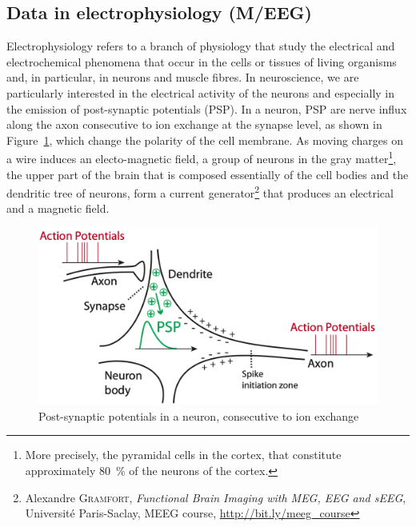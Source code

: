 \subsection{Data in electrophysiology (M/EEG)}\label{data_in_electrophysiology}

Electrophysiology refers to a branch of physiology that study the electrical and electrochemical phenomena that occur in the cells or tissues of living organisms and, in particular, in neurons and muscle fibres.
In neuroscience, we are particularly interested in the electrical activity of the neurons and especially in the emission of post-synaptic potentials (PSP).
In a neuron, PSP are nerve influx along the axon consecutive to ion exchange at the synapse level, as shown in Figure~\ref{fig:post_synaptic_potentials}, which change the polarity of the cell membrane.
As moving charges on a wire induces an electo-magnetic field, a group of neurons in the gray matter\footnote{More precisely, the pyramidal cells in the cortex, that constitute approximately \SI{80}{\percent} of the neurons of the cortex.}, the upper part of the brain that is composed essentially of the cell bodies and the dendritic tree of neurons, form a current generator\footnote{Alexandre \textsc{Gramfort}, \textit{ Functional Brain Imaging with MEG, EEG and sEEG}, Université Paris-Saclay, MEEG course, \url{http://bit.ly/meeg_course}} that produces an electrical and a magnetic field.

\begin{figure}[h]
    \centering
    \includegraphics[scale=0.25]{pics/post-synaptic_potentials.png}
    \caption{Post-synaptic potentials in a neuron, consecutive to ion exchange}
    \label{fig:post_synaptic_potentials}
\end{figure}

